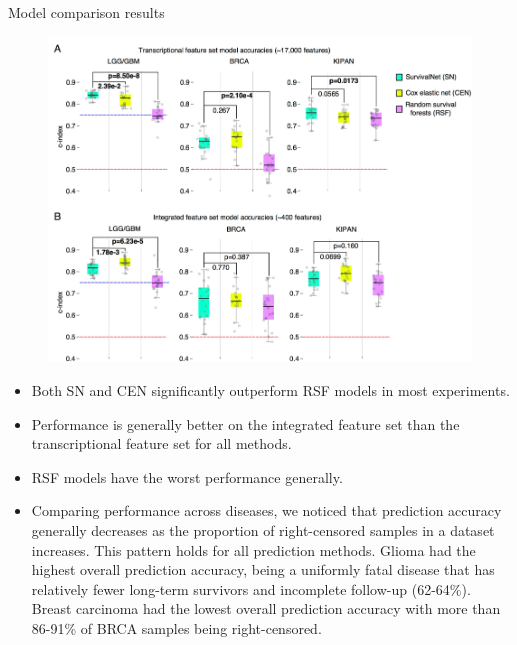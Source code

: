 \documentclass[
]{beamer}
\begin{document}
	
	\begin{frame}{Model comparison results}
		\begin{figure}
			\includegraphics[scale=0.4]{res1}
		\end{figure}
	\end{frame}
	
	\begin{frame}
		\begin{itemize}
			\item Both SN and CEN significantly outperform RSF models in most experiments.
			\item Performance is generally better on the integrated feature set than the transcriptional feature set for all methods.
			\item RSF models have the
			worst performance generally.
			\item Comparing performance across diseases,
			we noticed that prediction accuracy generally decreases as the proportion of right-censored samples in a dataset
			increases. This pattern holds for all prediction methods. Glioma had the highest overall prediction accuracy,
			being a uniformly fatal disease that has relatively fewer long-term survivors and incomplete follow-up (62-64\%).
			Breast carcinoma had the lowest overall prediction accuracy with more than 86-91\% of BRCA samples being
			right-censored.
		\end{itemize}
	\end{frame}
	
\end{document}
